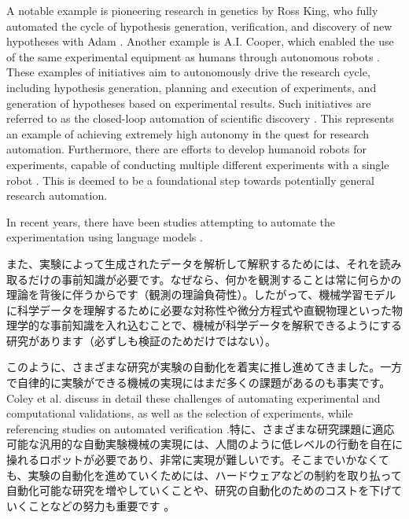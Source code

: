 A notable example is pioneering research in genetics by Ross King, who fully automated the cycle of hypothesis generation, verification, and discovery of new hypotheses with Adam \cite{king2004functional}. Another example is A.I. Cooper, which enabled the use of the same experimental equipment as humans through autonomous robots \cite{burger2020mobile}. These examples of initiatives aim to autonomously drive the research cycle, including hypothesis generation, planning and execution of experiments, and generation of hypotheses based on experimental results. Such initiatives are referred to as the closed-loop automation of scientific discovery     \cite{burger2020mobile,king2004functional}. This represents an example of achieving extremely high autonomy in the quest for research automation. Furthermore, there are efforts to develop humanoid robots for experiments, capable of conducting multiple different experiments with a single robot \cite{yachie2017robotic}. This is deemed to be a foundational step towards potentially general research automation. 

In recent years, there have been studies attempting to automate the experimentation using language models \cite{boiko2023emergent,charness2023generation,qin2023gpt}.

また、実験によって生成されたデータを解析して解釈するためには、それを読み取るだけの事前知識が必要です。なぜなら、何かを観測することは常に何らかの理論を背後に伴うからです（観測の理論負荷性）。したがって、機械学習モデルに科学データを理解するために必要な対称性や微分方程式や直観物理といった物理学的な事前知識を入れ込むことで、機械が科学データを解釈できるようにする研究があります（必ずしも検証のためだけではない）。

このように、さまざまな研究が実験の自動化を着実に推し進めてきました。一方で自律的に実験ができる機械の実現にはまだ多くの課題があるのも事実です。Coley et al. discuss in detail these challenges of automating experimental and computational validations, as well as the selection of experiments, while referencing studies on automated verification \cite{coley2020autonomousII}.特に、さまざまな研究課題に適応可能な汎用的な自動実験機械の実現には、人間のように低レベルの行動を自在に操れるロボットが必要であり、非常に実現が難しいです。そこまでいかなくても、実験の自動化を進めていくためには、ハードウェアなどの制約を取り払って自動化可能な研究を増やしていくことや、研究の自動化のためのコストを下げていくことなどの努力も重要です \cite{coley2020autonomousII}。



